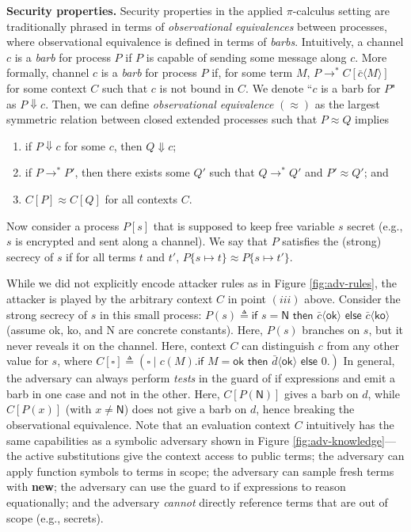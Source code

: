 \documentclass{article}
\theoremstyle{definition}
\begin{document}
\textbf{Security properties.}
Security properties in the applied $\pi$-calculus setting are traditionally phrased in terms of 
\textit{observational equivalences} between processes, 
where observational equivalence is defined in terms of \textit{barbs}. 
Intuitively, a channel $c$ is a \textit{barb} for process $P$ if $P$ is capable of sending some message along $c$. 
More formally, channel $c$ is a \textit{barb} for process $P$ if, for some term $M$, 
$P \rightarrow^* C[\bar{c}\langle M \rangle]$  for some context $C$ such that $c$ is not bound in $C$. 
We denote ``$c$ is a barb for $P$" as $P \Downarrow c$. Then, we can define \textit{observational equivalence} 
$(\approx)$ as the largest symmetric relation between closed extended processes such that $P \approx Q$ implies
\begin{enumerate}
    \item[$(i)$] if $P \Downarrow c$ for some $c$, then $Q \Downarrow c$;
    \item[$(ii)$] if $P \rightarrow^* P'$, then there exists some $Q'$ such that $Q \rightarrow^* Q'$ and $P' \approx Q'$; and
    \item[$(iii)$] $C[P] \approx C[Q]$ for all contexts $C$.
\end{enumerate}

Now consider a process $P[s]$ that is supposed to keep free variable $s$ secret 
(e.g., $s$ is encrypted and sent along a channel). 
We say that $P$ satisfies the (strong) secrecy of $s$ if for all terms $t$ and  $t'$, $P\{s \mapsto t\} \approx P\{s \mapsto t'\}$.

While we did not explicitly encode attacker rules as in Figure \ref{fig:adv-rules}, 
the attacker is played by the arbitrary context $C$ in point $(iii)$ above. 
Consider the strong secrecy of $s$ in this small process: 
$P(s) \triangleq \textsf{if }s = \textsf{N}\textsf{ then } \bar c \langle \mathsf{ok} \rangle 
\textsf{ else } \bar c \langle \mathsf{ko} \rangle $ (assume \textsf{ok},  \textsf{ko}, and \textsf{N} are concrete constants). 
Here, $P(s)$ branches on $s$, but it never reveals it on the channel. Here, context $C$ can distinguish $c$ 
from any other value for $s$, where 
$C[\square] \triangleq (\square \mid c(M). \textsf{if }M=\textsf{ok} \textsf{ then } \bar d\langle \textsf{ok} \rangle \textsf{ else } 0.)$ 
In general, the adversary can always perform \emph{tests} in the guard of \textsf{if} expressions 
and emit a barb in one case and not in the other. Here, $C[P(\mathsf{N})]$ gives a barb on $d$, 
while $C[P(x)]$ (with $x \neq \mathsf{N}$) does not give a barb on $d$, hence breaking the observational equivalence. 
Note that an evaluation context $C$ intuitively has the same capabilities as a symbolic adversary shown 
in Figure \ref{fig:adv-knowledge}---the active substitutions give the context access to public terms; 
the adversary can apply function symbols to terms in scope; 
the adversary can sample fresh terms with \textbf{\textsf{new}}; 
the adversary can use the guard to \textsf{if} expressions to reason equationally;  
and the adversary \emph{cannot} directly reference terms that are out of scope (e.g., secrets).
\end{document}
